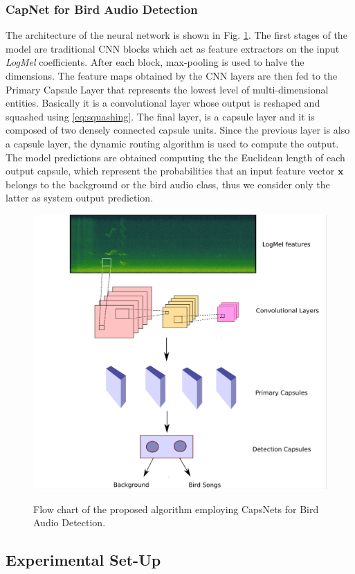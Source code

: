 \subsubsection{CapNet for Bird Audio Detection}
The architecture of the neural network is shown in Fig. \ref{fig:flowchart}. The first stages of the model are traditional CNN blocks which act as feature extractors on the input \textit{LogMel} coefficients.
After each block, max-pooling is used to halve the dimensions. The feature maps obtained by the CNN layers are then fed to the Primary Capsule Layer that represents the lowest level of multi-dimensional entities. Basically it is a convolutional layer whose output is reshaped and squashed using \eqref{eq:squashing}. The final layer, is a capsule layer and it is composed of two densely connected capsule units.
Since the previous layer is also a capsule layer, the dynamic routing algorithm is used to compute the output. The model predictions are obtained computing the the Euclidean length of each
output capsule, which represent the probabilities that an input feature vector $\mathbf{x}$ belongs to the background or the bird audio class, thus we consider only the latter as system output prediction.

\begin{figure}[htbp]
	\centering
	\includegraphics[width=0.6\columnwidth]{img/capsule_for_bad}
	\label{fig:flowchart}
	\caption[CapsNet for Bird Audio Detection]{Flow chart of the proposed algorithm employing CapsNets for Bird Audio Detection.}
\end{figure}

\subsection{Experimental Set-Up}
\label{sec:experiment}

